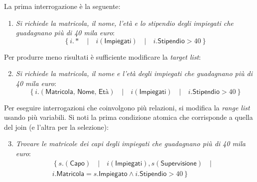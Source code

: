 \documentclass[a4paper]{article}
\begin{document}
	\noindent
	La prima interrogazione è la seguente:
	\begin{enumerate}
		\item \emph{Si richiede la matricola, il nome, l'età e lo stipendio degli impiegati che guadagnano più di 40 mila euro}:
		\begin{equation*}
			\left\{
			i.* \hspace{1em} | \hspace{1em}
			i\left(\textsf{Impiegati}\right) \hspace{1em} | \hspace{1em}
			i.\textsf{Stipendio} > 40
			\right\}
		\end{equation*}
	\end{enumerate}
	Per produrre meno risultati è sufficiente modificare la \emph{target list}:
	\begin{enumerate}
		\setcounter{enumi}{1}
		\item \emph{Si richiede la matricola, il nome e l'età degli impiegati che guadagnano più di 40 mila euro}:
		\begin{equation*}
			\left\{
			i.\left(\textsf{Matricola, Nome, Età}\right) \hspace{1em} | \hspace{1em}
			i\left(\textsf{Impiegati}\right) \hspace{1em} | \hspace{1em}
			i.\textsf{Stipendio} > 40
			\right\}
		\end{equation*}
	\end{enumerate}
	Per eseguire interrogazioni che coinvolgono più relazioni, si modifica la \emph{range list} usando più variabili. Si noti la prima condizione atomica che corrisponde a quella del join (e l'altra per la selezione):
	\begin{enumerate}
		\setcounter{enumi}{2}
		\item \emph{Trovare le matricole dei capi degli impiegati che guadagnano più di 40 mila euro}:
		\begin{gather*}
			\left\{
			s.\left(\textsf{Capo}\right) \hspace{1em} | \hspace{1em}
			i\left(\textsf{Impiegati}\right), s\left(\textsf{Supervisione}\right) \hspace{1em} | \hspace{1em} \right. \\
			\left. i.\textsf{Matricola} = s.\textsf{Impiegato} \land i.\textsf{Stipendio} > 40
			\right\}
		\end{gather*}
	\end{enumerate}
\end{document}
